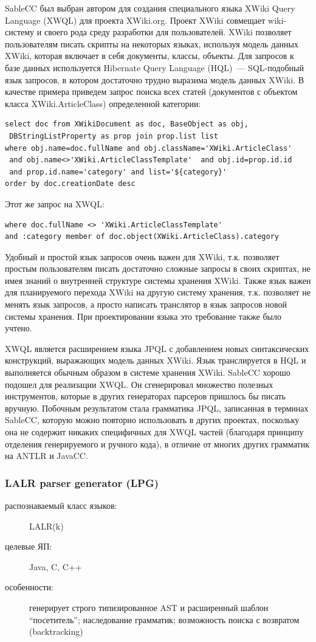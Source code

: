 \documentclass[a4paper,12pt,titlepage]{extarticle}
\begin{document}
SableCC был выбран автором для создания специального языка XWiki Query Language
(XWQL) \cite{xwql} для проекта XWiki.org. Проект XWiki совмещает wiki-систему и
своего рода среду разработки для пользователей. XWiki позволяет пользователям
писать скрипты на некоторых языках, используя модель данных XWiki, которая
включает в себя документы, классы, объекты. Для запросов к базе данных
используется Hibernate Query Language (HQL)~--- SQL-подобный язык запросов, в
котором достаточно трудно выразима модель данных XWiki. В качестве примера
приведем запрос поиска всех статей (документов с объектом класса
XWiki.ArticleClass) определенной категории:
\begin{verbatim}
select doc from XWikiDocument as doc, BaseObject as obj, 
 DBStringListProperty as prop join prop.list list
where obj.name=doc.fullName and obj.className='XWiki.ArticleClass' 
 and obj.name<>'XWiki.ArticleClassTemplate'  and obj.id=prop.id.id
 and prop.id.name='category' and list='${category}'
order by doc.creationDate desc
\end{verbatim}
Этот же запрос на XWQL:
\begin{verbatim}
where doc.fullName <> 'XWiki.ArticleClassTemplate' 
and :category member of doc.object(XWiki.ArticleClass).category
\end{verbatim}
Удобный и простой язык запросов очень важен для XWiki, т.к. позволяет простым
пользователям писать достаточно сложные запросы в своих скриптах, не имея
знаний о внутренней структуре системы хранения XWiki. Также язык важен для
планируемого перехода XWiki на другую систему хранения, т.к. позволяет не менять
язык запросов, а просто написать транслятор в язык запросов новой системы
хранения. При проектировании языка это требование также было учтено.

XWQL является расширением языка JPQL \cite{jpql} с добавлением новых
синтаксических конструкций, выражающих модель данных XWiki. Язык транслируется
в HQL и выполняется обычным образом в системе хранения XWiki. SableCC хорошо
подошел для реализации XWQL. Он сгенерировал множество полезных инструментов,
которые в других генераторах парсеров пришлось бы писать вручную. Побочным
результатом стала грамматика JPQL, записанная в терминах SableCC, которую можно
повторно использовать в других проектах, поскольку она не содержит никаких
специфичных для XWQL частей (благодаря принципу отделения генерируемого и
ручного кода), в отличие от многих других грамматик на ANTLR и JavaCC.

\subsubsection*{LALR parser generator (LPG)}
\begin{description}
  \item[распознаваемый класс языков:] LALR(k)
  \item[целевые ЯП:] Java, C, C++
  \item[особенности:] генерирует строго типизированное AST и расширенный
 	шаблон ``посетитель''; наследование грамматик; возможность поиска с возвратом
 	(backtracking)
\end{description}
\end{document}
